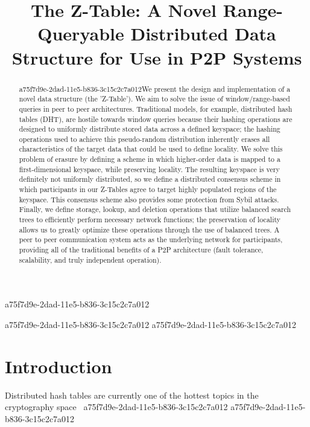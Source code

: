 \documentclass[12pt]{article}
\title{The Z-Table: A Novel Range-Queryable Distributed Data Structure for Use in P2P Systems}
\begin{document}
a75f7d9e-2dad-11e5-b836-3c15c2c7a012
\maketitle

\begin{abstract}
a75f7d9e-2dad-11e5-b836-3c15c2c7a012We present the design and implementation of a novel data structure (the 'Z-Table'). We aim to solve the issue of window/range-based queries in peer to peer architectures. Traditional models, for example,  distributed hash tables (DHT), are hostile towards window queries because their hashing operations are designed to uniformly distribute stored data across a defined keyspace; the hashing operations used to achieve this pseudo-random distribution inherently erases all characteristics of the target data that could be used to define locality. We solve this problem of erasure by defining a scheme in which higher-order data is mapped to a first-dimensional keyspace, while preserving locality. The resulting keyspace is very definitely not uniformly distributed, so we define a distributed consensus scheme in which participants in our Z-Tables agree to target highly populated regions of the keyspace. This consensus scheme also provides some protection from Sybil attacks. Finally, we define storage, lookup, and deletion operations that utilize balanced search trees to efficiently perform necessary network functions; the preservation of locality allows us to greatly optimize these operations through the use of balanced trees. A peer to peer communication system acts as the underlying network for participants, providing all of the traditional benefits of a P2P architecture (fault tolerance, scalability, and truly independent operation).
\end{abstract}


a75f7d9e-2dad-11e5-b836-3c15c2c7a012\newpage
a75f7d9e-2dad-11e5-b836-3c15c2c7a012\section{Introduction}
Distributed hash tables are currently one of the hottest topics in the cryptography space~\cite{Stoica:2001dj,Rowstron:2001ea,Ratnasamy:2001wn}
a75f7d9e-2dad-11e5-b836-3c15c2c7a012
\printbibliography
a75f7d9e-2dad-11e5-b836-3c15c2c7a012
\end{document}
